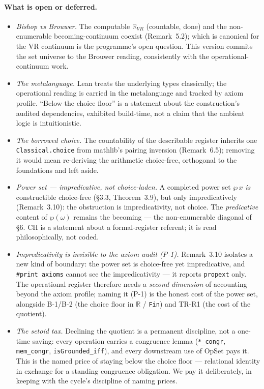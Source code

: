 \documentclass[11pt]{article}
\theoremstyle{remark}
\newcommand{\OpSet}{\textsf{OpSet}}
\newcommand{\R}{\mathbb{R}}
\begin{document}
\paragraph{What is open or deferred.}
\begin{itemize}
\item \emph{Bishop vs Brouwer.} The computable $\R_{VR}$ (countable, done) and the non-enumerable
becoming-continuum coexist (Remark~5.2); which is canonical for the VR continuum is the programme's
open question. This version commits the set universe to the Brouwer reading, consistently with the
operational-continuum work.
\item \emph{The metalanguage.} Lean treats the underlying types classically; the operational reading
is carried in the metalanguage and tracked by axiom profile. ``Below the choice floor'' is a
statement about the construction's audited dependencies, exhibited build-time, not a claim that the
ambient logic is intuitionistic.
\item \emph{The borrowed choice.} The countability of the describable register inherits one
\texttt{Classical.choice} from mathlib's pairing inversion (Remark~6.5); removing it would mean
re-deriving the arithmetic choice-free, orthogonal to the foundations and left aside.
\item \emph{Power set --- impredicative, not choice-laden.} A completed power set $\wp\,x$ \emph{is}
constructible choice-free (\S3.3, Theorem~3.9), but only impredicatively (Remark~3.10): the obstruction
is impredicativity, not choice. The \emph{predicative} content of $\wp(\omega)$ remains the becoming
--- the non-enumerable diagonal of \S6. CH is a statement about a formal-register referent; it is read
philosophically, not coded.
\item \emph{Impredicativity is invisible to the axiom audit (P-1).} Remark~3.10 isolates a new kind of
boundary: the power set is choice-free yet impredicative, and \texttt{\#print axioms} cannot see the
impredicativity --- it reports \texttt{propext} only. The operational register therefore needs a
\emph{second dimension} of accounting beyond the axiom profile; naming it (P-1) is the honest cost of
the power set, alongside B-1/B-2 (the choice floor in $\R$ / \texttt{Fin}) and TR-R1 (the cost of the
quotient).
\item \emph{The setoid tax.} Declining the quotient is a permanent discipline, not a one-time saving:
every operation carries a congruence lemma (\texttt{*\_congr}, \texttt{mem\_congr},
\texttt{isGrounded\_iff}), and every downstream use of \OpSet{} pays it. This is the named price of
staying below the choice floor --- relational identity in exchange for a standing congruence
obligation. We pay it deliberately, in keeping with the cycle's discipline of naming prices.
\end{itemize}
\end{document}
